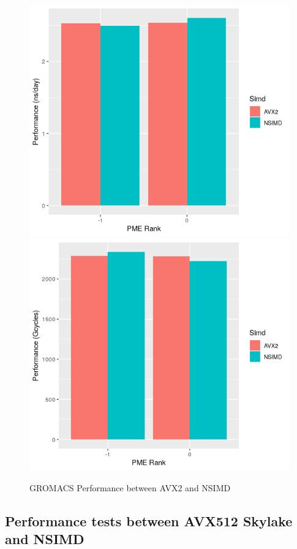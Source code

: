 \begin{figure}[!h]
\centering
        \includegraphics[scale=0.8]{AVX2.png}
        \includegraphics[scale=0.8]{AVX2_2.png}
        \caption{GROMACS Performance between AVX2 and NSIMD}
        \label{fg:f4}
\end{figure}
\newpage

\subsection{Performance tests between AVX512 Skylake and NSIMD}
